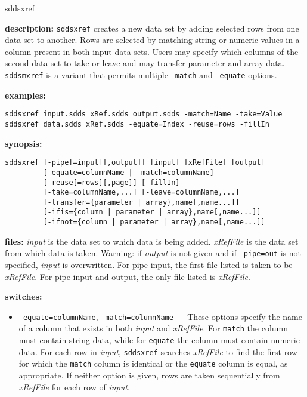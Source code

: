 \begin{sddsprog}{sddsxref}
  \item \textbf{description:}
  \verb|sddsxref| creates a new data set by adding selected rows from one data set to another.
  Rows are selected by matching string or numeric values in a column present in both input data sets.
  Users may specify which columns of the second data set to take or leave and may transfer
  parameter and array data. \verb|sddsmxref| is a variant that permits multiple \verb|-match|
  and \verb|-equate| options.
  \item \textbf{examples:}
    \begin{verbatim}
sddsxref input.sdds xRef.sdds output.sdds -match=Name -take=Value
sddsxref data.sdds xRef.sdds -equate=Index -reuse=rows -fillIn
    \end{verbatim}
  \item \textbf{synopsis:}
    \begin{verbatim}
sddsxref [-pipe[=input][,output]] [input] [xRefFile] [output]
         [-equate=columnName | -match=columnName]
         [-reuse[=rows][,page]] [-fillIn]
         [-take=columnName,...] [-leave=columnName,...]
         [-transfer={parameter | array},name[,name...]]
         [-ifis={column | parameter | array},name[,name...]]
         [-ifnot={column | parameter | array},name[,name...]]
    \end{verbatim}
  \item \textbf{files:}
    \emph{input} is the data set to which data is being added. \emph{xRefFile} is the data set from
    which data is taken. Warning: if \emph{output} is not given and if \verb|-pipe=out| is not
    specified, \emph{input} is overwritten. For pipe input, the first file listed is taken to be
    \emph{xRefFile}. For pipe input and output, the only file listed is \emph{xRefFile}.
  \item \textbf{switches:}
    \begin{itemize}
      \item \verb|-equate=columnName|, \verb|-match=columnName| --- These options specify the name of a column
        that exists in both \emph{input} and \emph{xRefFile}. For \verb|match| the column must contain
        string data, while for \verb|equate| the column must contain numeric data. For each row in
        \emph{input}, \verb|sddsxref| searches \emph{xRefFile} to find the first row for which the
        \verb|match| column is identical or the \verb|equate| column is equal, as appropriate. If neither
        option is given, rows are taken sequentially from \emph{xRefFile} for each row of \emph{input}.

\end{itemize}
\end{sddsprog}

